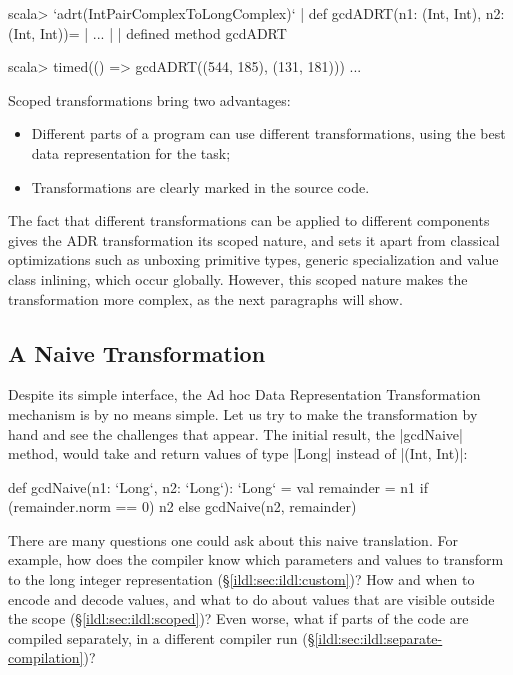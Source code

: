 \begin{lstlisting-nobreak}
scala> `adrt(IntPairComplexToLongComplex)` {
       |   def gcdADRT(n1: (Int, Int), n2: (Int, Int))={
       |     ...
       |   }
       | }
defined method gcdADRT

scala> timed(() => gcdADRT((544, 185), (131, 181)))
...
\end{lstlisting-nobreak}

Scoped transformations bring two advantages:


\begin{itemize}
 \item Different parts of a program can use different transformations, using the best data representation for the task;
 \item Transformations are clearly marked in the source code.
\end{itemize}


The fact that different transformations can be applied to different components gives the ADR transformation its scoped nature, and sets it apart from classical optimizations such as unboxing primitive types, generic specialization and value class inlining, which occur globally. However, this scoped nature makes the transformation more complex, as the next paragraphs will show.

\subsection{A Naive Transformation}

Despite its simple interface, the Ad hoc Data Representation Transformation mechanism is by no means simple. Let us try to make the transformation by hand and see the challenges that appear. The initial result, the |gcdNaive| method, would take and return values of type |Long| instead of |(Int, Int)|:

\begin{lstlisting-nobreak}
def gcdNaive(n1: `Long`, n2: `Long`): `Long` = {
  val remainder = n1 %
  if (remainder.norm == 0) n2 else gcdNaive(n2, remainder)
}
\end{lstlisting-nobreak}

There are many questions one could ask about this naive translation. For example, how does the compiler know which parameters and values to transform to the long integer representation (\S\ref{ildl:sec:ildl:custom})? How and when to encode and decode values, and what to do about values that are visible outside the scope (\S\ref{ildl:sec:ildl:scoped})? Even worse, what if parts of the code are compiled separately, in a different compiler run (\S\ref{ildl:sec:ildl:separate-compilation})?

